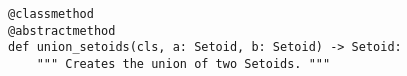 \par\begin{minipage}{60ex}
\begin{verbatim}
@classmethod
@abstractmethod
def union_setoids(cls, a: Setoid, b: Setoid) -> Setoid:
    """ Creates the union of two Setoids. """
\end{verbatim}
\end{minipage}\par